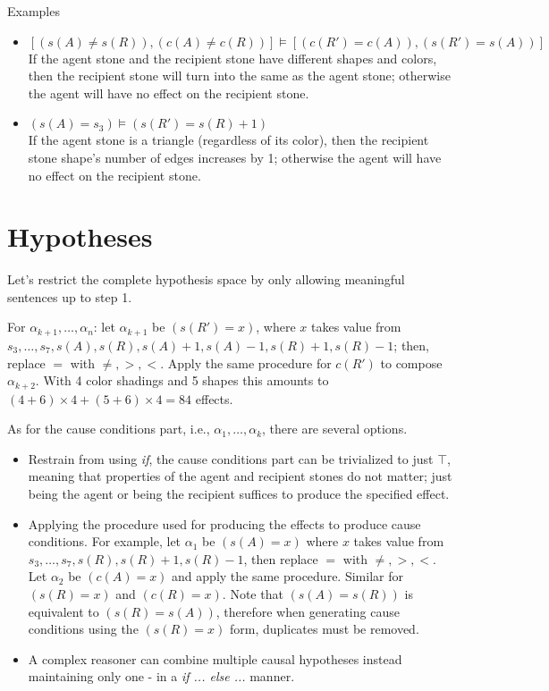 \documentclass[11pt]{article}
\begin{document}
Examples

\begin{itemize}
	\item $[(s(A) \neq s(R)), (c(A) \neq c(R))] \models [(c(R') = c(A)), (s(R') = s(A))]$ \\
	If the agent stone and the recipient stone have different shapes and colors, then the recipient stone will turn into the same as the agent stone;
	otherwise the agent will have no effect on the recipient stone.
	\item $(s(A) = s_3) \models (s(R') = s(R) + 1)$ \\
	If the agent stone is a triangle (regardless of its color), then the recipient stone shape's number of edges increases by 1;
	otherwise the agent will have no effect on the recipient stone.
\end{itemize}

\section*{Hypotheses}

Let's restrict the complete hypothesis space by only allowing meaningful sentences up to step 1. 

For $\alpha_{k + 1}, \ldots, \alpha_n$:
	let $\alpha_{k + 1}$ be $(s(R') = x)$, 
	where $x$ takes value from
	$s_3, \ldots, s_7, s(A), s(R), s(A) + 1, s(A) - 1, s(R) + 1, s(R) - 1$;
then, replace $=$ with $\neq, >, <$.
Apply the same procedure for $c(R')$ to compose $\alpha_{k+2}$. 
With 4 color shadings and 5 shapes this amounts to
$(4 + 6) \times 4 +  (5 + 6) \times 4 = 84$
effects.

As for the cause conditions part, i.e., $\alpha_1, \ldots, \alpha_k$, there are several options.

\begin{itemize}
 \item Restrain from using \textit{if}, the cause conditions part can be trivialized to just $\top$,
 	meaning that properties of the agent and recipient stones do not matter;
 	just being the agent or being the recipient suffices to produce the specified effect.
 \item Applying the procedure used for producing the effects to produce cause conditions. 
 	For example, let $\alpha_1$ be $(s(A) = x)$ where $x$ takes value from 
 	$s_3, \ldots, s_7, s(R), s(R) + 1, s(R) - 1$, 
 	then replace $=$ with $\neq, >, <$. 
 	Let $\alpha_2$ be $(c(A) = x)$ and apply the same procedure.
 	Similar for $(s(R) = x)$ and $(c(R) = x)$.
 	Note that $(s(A) = s(R))$ is equivalent to $(s(R) = s(A))$, 
 	therefore when generating cause conditions using the $(s(R) = x)$ form, duplicates must be removed.


\newpage
 \item A complex reasoner can combine multiple causal hypotheses instead maintaining only one - in a \textit{if ... else ...} manner.
\end{itemize}
\end{document}
